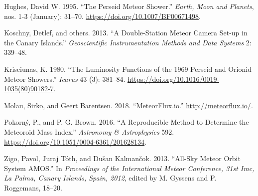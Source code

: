 \hypertarget{ref-hughes1995}{}
Hughes, David W. 1995. ``The Perseid Meteor Shower.'' \emph{Earth, Moon
and Planets}, nos. 1-3 (January): 31--70.
\url{https://doi.org/10.1007/BF00671498}.

\hypertarget{ref-koschny2013}{}
Koschny, Detlef, and others. 2013. ``A Double-Station Meteor Camera
Set-up in the Canary Islands.'' \emph{Geoscientific Instrumentation
Methods and Data Systems} 2: 339--48.

\hypertarget{ref-krisciunas1980}{}
Krisciunas, K. 1980. ``The Luminosity Functions of the 1969 Perseid and
Orionid Meteor Showers.'' \emph{Icarus} 43 (3): 381--84.
\url{https://doi.org/10.1016/0019-1035(80)90182-7}.

\hypertarget{ref-meteorflux}{}
Molau, Sirko, and Geert Barentsen. 2018. ``MeteorFlux.io.''
\url{http://meteorflux.io/}.

\hypertarget{ref-pokorny-brown2016}{}
Pokorný, P., and P. G. Brown. 2016. ``A Reproducible Method to Determine
the Meteoroid Mass Index.'' \emph{Astronomy \& Astrophysics} 592.
\url{https://doi.org/10.1051/0004-6361/201628134}.

\hypertarget{ref-zigo2013}{}
Zigo, Pavol, Juraj Tóth, and Dušan Kalmančok. 2013. ``All-Sky Meteor
Orbit System AMOS.'' In \emph{Proceedings of the International Meteor
Conference, 31st Imc, La Palma, Canary Islands, Spain, 2012}, edited by
M. Gyssens and P. Roggemans, 18--20.
